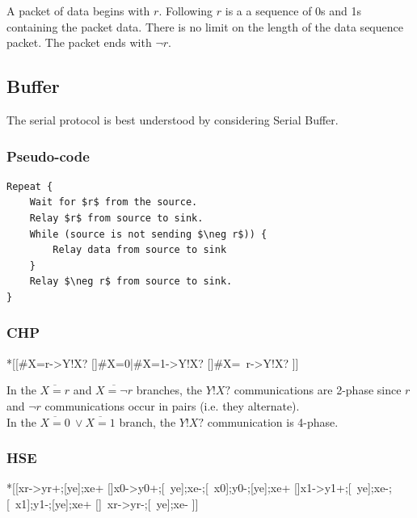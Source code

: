 \documentclass{article}
\begin{document}
A packet of data begins with $r$.
Following $r$ is a a sequence of 0s and 1s containing the packet data.
There is no limit on the length of the data sequence packet.
The packet ends with $\neg r$.

\subsection{Buffer}

\noindent
The serial protocol is best understood by considering Serial Buffer.

\subsubsection*{Pseudo-code}

\begin{lstlisting}[mathescape]
Repeat {
    Wait for $r$ from the source.
    Relay $r$ from source to sink.
    While (source is not sending $\neg r$)) {
        Relay data from source to sink
    }
    Relay $\neg r$ from source to sink.
}
\end{lstlisting}

\subsubsection*{CHP}

\begin{csp}
*[[#{X=r}->Y!X?
  []#{X=0}|#{X=1}->Y!X?
  []#{X=\neg\ r}->Y!X?
 ]]
\end{csp}

\noindent
In the $\overline{X=r}$ and $\overline{X=\neg r}$ branches,
the $Y!X?$ communications are 2-phase since $r$ and $\neg r$
communications occur in pairs (i.e. they alternate). \\
In the $\overline{X=0}\ \vee \overline{X=1}$ branch,
the $Y!X?$ communication is 4-phase.


\subsubsection*{HSE}

\begin{hse}
*[[xr->yr+;[ye];xe+
  []x0->y0+;[~ye];xe-;[~x0];y0-;[ye];xe+
  []x1->y1+;[~ye];xe-;[~x1];y1-;[ye];xe+
  []~xr->yr-;[~ye];xe-
 ]]
\end{hse}
\end{document}
